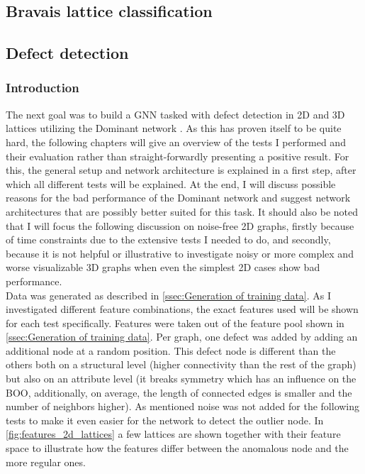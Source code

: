 \documentclass[11pt,a4paper]{article}
\begin{document}
\subsection{Bravais lattice classification}
\label{ssec:Bravais lattice classification}

\subsection{Defect detection}
\label{ssec:Defect detection}
\subsubsection{Introduction}
The next goal was to build a GNN tasked with defect detection in 2D and 3D lattices utilizing the Dominant network \cite{dingDeepAnomalyDetection2019}. 
As this has proven itself to be quite hard, the following chapters will give an overview of the tests I performed and their evaluation rather than straight-forwardly presenting a positive result. 
For this, the general setup and network architecture is explained in a first step, after which all different tests will be explained. 
At the end, I will discuss possible reasons for the bad performance of the Dominant network and suggest network architectures that are possibly better suited for this task. 
It should also be noted that I will focus the following discussion on noise-free 2D graphs, firstly because of time constraints due to the extensive tests I needed to do, and secondly, because it is not helpful or illustrative to investigate noisy or more complex and worse visualizable 3D graphs when even the simplest 2D cases show bad performance. \\

Data was generated as described in \autoref{ssec:Generation of training data}. 
As I investigated different feature combinations, the exact features used will be shown for each test specifically. 
Features were taken out of the feature pool shown in \autoref{ssec:Generation of training data}. 
Per graph, one defect was added by adding an additional node at a random position. 
This defect node is different than the others both on a structural level (higher connectivity than the rest of the graph) but also on an attribute level (it breaks symmetry which has an influence on the BOO, additionally, on average, the length of connected edges is smaller and the number of neighbors higher). 
As mentioned noise was not added for the following tests to make it even easier for the network to detect the outlier node. 
In \autoref{fig:features_2d_lattices} a few lattices are shown together with their feature space to illustrate how the features differ between the anomalous node and the more regular ones. 
\end{document}
